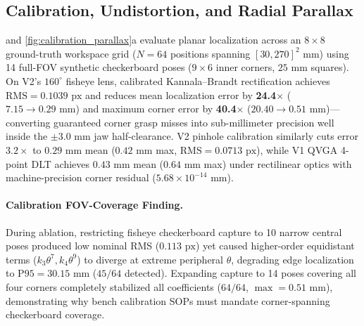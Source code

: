 \documentclass[10pt,twocolumn,letterpaper]{article}
\begin{document}
\subsection{Calibration, Undistortion, and Radial Parallax}
 and \cref{fig:calibration_parallax}a evaluate planar localization across an $8\times 8$ ground-truth workspace grid ($N=64$ positions spanning $[30,270]^2\text{ mm}$) using 14 full-FOV synthetic checkerboard poses ($9\times 6$ inner corners, $25\text{ mm}$ squares). On V2's $160^\circ$ fisheye lens, calibrated Kannala--Brandt rectification achieves $\text{RMS} = 0.1039\text{ px}$ and reduces mean localization error by \textbf{24.4$\times$} ($7.15\to 0.29\text{ mm}$) and maximum corner error by \textbf{40.4$\times$} ($20.40\to 0.51\text{ mm}$)—converting guaranteed corner grasp misses into sub-millimeter precision well inside the $\pm 3.0\text{ mm}$ jaw half-clearance. V2 pinhole calibration similarly cuts error $3.2\times$ to $0.29\text{ mm}$ mean ($0.42\text{ mm}$ max, $\text{RMS}=0.0713\text{ px}$), while V1 QVGA 4-point DLT achieves $0.43\text{ mm}$ mean ($0.64\text{ mm}$ max) under rectilinear optics with machine-precision corner residual ($5.68\times 10^{-14}\text{ mm}$).

\paragraph{Calibration FOV-Coverage Finding.}
During ablation, restricting fisheye checkerboard capture to 10 narrow central poses produced low nominal RMS ($0.113\text{ px}$) yet caused higher-order equidistant terms ($k_3\theta^7, k_4\theta^9$) to diverge at extreme peripheral $\theta$, degrading edge localization to $\text{P95} = 30.15\text{ mm}$ ($45/64$ detected). Expanding capture to 14 poses covering all four corners completely stabilized all coefficients ($64/64$, $\max = 0.51\text{ mm}$), demonstrating why bench calibration SOPs must mandate corner-spanning checkerboard coverage.
\end{document}
